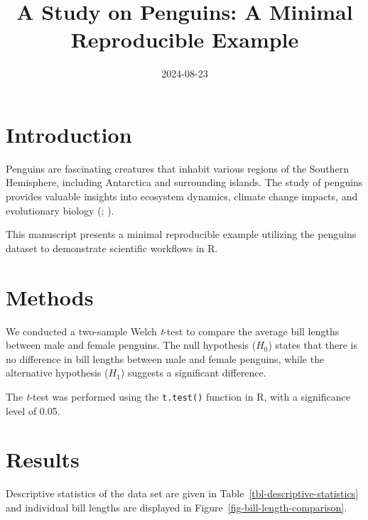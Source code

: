 \documentclass[
  man,
  longtable,
  a4paper,
  nolmodern,
  notxfonts,
  notimes,
  colorlinks=true,linkcolor=blue,citecolor=blue,urlcolor=blue]{apa7}
\title{A Study on Penguins: A Minimal Reproducible Example}
\date{2024-08-23}
\begin{document}
\maketitle


\setcounter{secnumdepth}{-\maxdimen} %

\setlength\LTleft{0pt}


\section{Introduction}\label{introduction}

Penguins are fascinating creatures that inhabit various regions of the
Southern Hemisphere, including Antarctica and surrounding islands. The
study of penguins provides valuable insights into ecosystem dynamics,
climate change impacts, and evolutionary biology
(; ).

This manuscript presents a minimal reproducible example utilizing the
penguins dataset to demonstrate scientific workflows in R.

\section{Methods}\label{methods}

We conducted a two-sample Welch \emph{t}-test to compare the average
bill lengths between male and female penguins. The null hypothesis
(\(H_0\)) states that there is no difference in bill lengths between
male and female penguins, while the alternative hypothesis (\(H_1\))
suggests a significant difference.

The \emph{t}-test was performed using the \texttt{t.test()} function in
R, with a significance level of 0.05.

\section{Results}\label{results}

Descriptive statistics of the data set are given in
Table~\ref{tbl-descriptive-statistics} and individual bill lengths are
displayed in Figure~\ref{fig-bill-length-comparison}.
\end{document}
